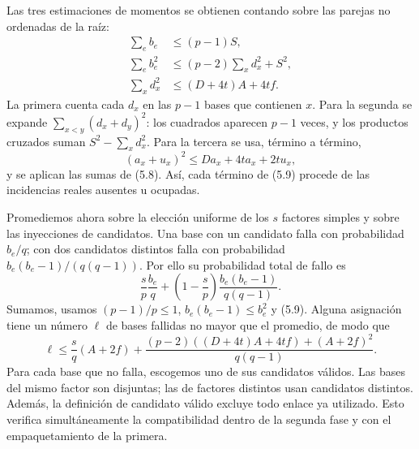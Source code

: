 \documentclass[spanish,11pt,a4paper]{article}
\begin{document}
Las tres estimaciones de momentos se obtienen contando sobre las parejas no ordenadas de la raíz: \[
\begin{aligned}
\sum_e b_e&\le(p-1)S,\\
\sum_e b_e^2&\le(p-2)\sum_xd_x^2+S^2,\\
\sum_xd_x^2&\le(D+4t)A+4tf.
\end{aligned}
\tag{5.9}
\] La primera cuenta cada \(d_x\) en las \(p-1\) bases que contienen \(x\). Para la segunda se expande \(\sum_{x<y}(d_x+d_y)^2\): los cuadrados aparecen \(p-1\) veces, y los productos cruzados suman \(S^2-\sum_xd_x^2\). Para la tercera se usa, término a término, \[
(a_x+u_x)^2\le Da_x+4ta_x+2tu_x,
\] y se aplican las sumas de (5.8). Así, cada término de (5.9) procede de las incidencias reales ausentes u ocupadas.

Promediemos ahora sobre la elección uniforme de los \(s\) factores simples y sobre las inyecciones de candidatos. Una base con un candidato falla con probabilidad \(b_e/q\); con dos candidatos distintos falla con probabilidad \(b_e(b_e-1)/(q(q-1))\). Por ello su probabilidad total de fallo es \[
\frac{s}{p}\frac{b_e}{q}
+\left(1-\frac{s}{p}\right)\frac{b_e(b_e-1)}{q(q-1)}.
\tag{5.10}
\] Sumamos, usamos \((p-1)/p\le1\), \(b_e(b_e-1)\le b_e^2\) y (5.9). Alguna asignación tiene un número \(\ell\) de bases fallidas no mayor que el promedio, de modo que \[
\ell\le\frac{s}{q}(A+2f)
+\frac{(p-2)((D+4t)A+4tf)+(A+2f)^2}{q(q-1)}.
\tag{5.11}
\] Para cada base que no falla, escogemos uno de sus candidatos válidos. Las bases del mismo factor son disjuntas; las de factores distintos usan candidatos distintos. Además, la definición de candidato válido excluye todo enlace ya utilizado. Esto verifica simultáneamente la compatibilidad dentro de la segunda fase y con el empaquetamiento de la primera.
\end{document}
